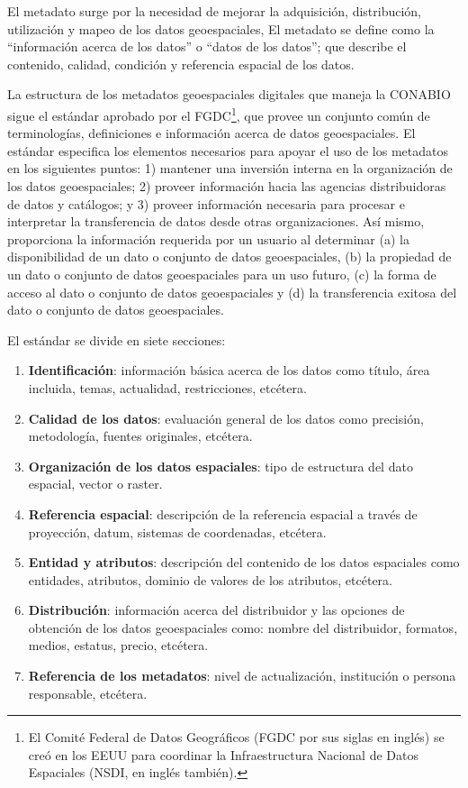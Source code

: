 \documentclass[twoside]{book}
\begin{document}
El metadato surge por la necesidad de mejorar la adquisición, distribución, utilización y mapeo de los datos geoespaciales, El metadato se define como la “información acerca de los datos” o “datos de los datos”; que describe el contenido, calidad, condición y referencia espacial de los datos. 

La estructura de los metadatos geoespaciales digitales que maneja la CONABIO sigue el estándar aprobado por el FGDC\footnote{El Comité Federal de Datos Geográficos (FGDC por sus siglas en inglés) se creó en los EEUU para coordinar la Infraestructura Nacional de Datos Espaciales (NSDI, en inglés también).}, que provee un conjunto común de terminologías, definiciones e información acerca de datos geoespaciales. El estándar especifica los elementos necesarios para apoyar el uso de los metadatos en los siguientes puntos: 1) mantener una inversión interna en la organización de los datos geoespaciales; 2) proveer información hacia las agencias distribuidoras de datos y catálogos; y 3) proveer información necesaria para procesar e interpretar la transferencia de datos desde otras organizaciones. Así mismo, proporciona la información requerida por un usuario al determinar (a) la disponibilidad de un dato o conjunto de datos geoespaciales, (b) la propiedad de un dato o conjunto de datos geoespaciales para un uso futuro, (c) la forma de acceso al dato o conjunto de datos geoespaciales y (d) la transferencia exitosa del dato o conjunto de datos geoespaciales.

El estándar se divide en siete secciones:

\begin{enumerate}
\item \textbf{Identificación}: información básica acerca de los datos como título, área incluida, temas, actualidad, restricciones, etcétera.
\item \textbf{Calidad de los datos}: evaluación general de los datos como precisión, metodología, fuentes originales, etcétera.
\item \textbf{Organización de los datos espaciales}: tipo de estructura del dato espacial, vector o raster.
\item \textbf{Referencia espacial}: descripción de la referencia espacial a través de proyección, datum, sistemas de coordenadas, etcétera.
\item \textbf{Entidad y atributos}: descripción del contenido de los datos espaciales como entidades, atributos, dominio de valores de los atributos, etcétera.
\item \textbf{Distribución}: información acerca del distribuidor y las opciones de obtención de los datos geoespaciales como: nombre del distribuidor, formatos, medios, estatus, precio, etcétera.
\item \textbf{Referencia de los metadatos}: nivel de actualización, institución o persona responsable, etcétera.
\end{enumerate}
\end{document}
